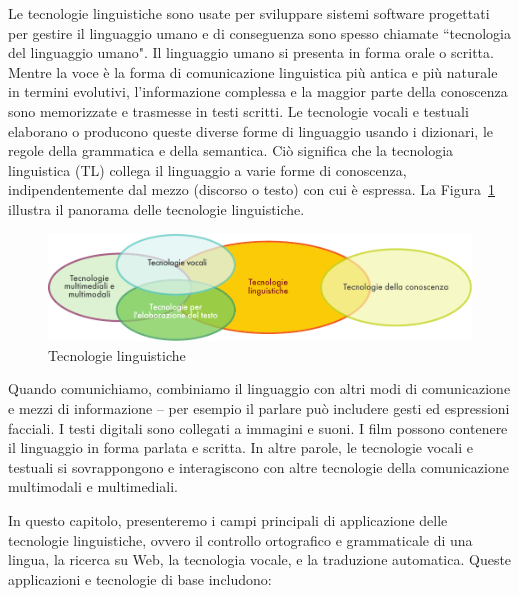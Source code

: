 \begin{multicols}{2}

Le tecnologie linguistiche sono usate per sviluppare sistemi software
progettati per gestire il linguaggio umano e di conseguenza sono spesso
chiamate “tecnologia del linguaggio umano". Il linguaggio umano si presenta in
forma orale o scritta. Mentre la voce \`{e} la forma di comunicazione
linguistica pi\`{u} antica e pi\`{u} naturale in termini evolutivi,
l'informazione complessa e la maggior parte della conoscenza sono memorizzate
e trasmesse in testi scritti. Le tecnologie vocali e testuali elaborano o
producono queste diverse forme di linguaggio usando i dizionari, le regole
della grammatica e della semantica. Ci\`{o} significa che la tecnologia
linguistica (TL) collega il linguaggio a varie forme di conoscenza,
indipendentemente dal mezzo (discorso o testo) con cui \`{e} espressa. La
Figura~\ref{fig:ltincontext_de} illustra il panorama delle tecnologie
linguistiche. 


\begin{figure}[htb]
  \center
  \includegraphics[width=\textwidth]{../_media/italian/language_technologies}
  \caption{Tecnologie linguistiche}
  \label{fig:ltincontext_de}
\end{figure}

Quando comunichiamo, combiniamo il linguaggio con altri modi di comunicazione
e mezzi di informazione -- per esempio il parlare pu\`{o} includere gesti ed
espressioni facciali. I testi digitali sono collegati a immagini e suoni. I
film possono contenere il linguaggio in forma parlata e scritta. In altre
parole, le tecnologie vocali e testuali si sovrappongono e interagiscono con
altre tecnologie della comunicazione multimodali e multimediali.

In questo capitolo, presenteremo i campi principali di applicazione delle
tecnologie linguistiche, ovvero il controllo ortografico e grammaticale di una
lingua, la ricerca su Web, la tecnologia vocale, e la traduzione automatica.
Queste applicazioni e tecnologie di base includono:


\end{multicols}
